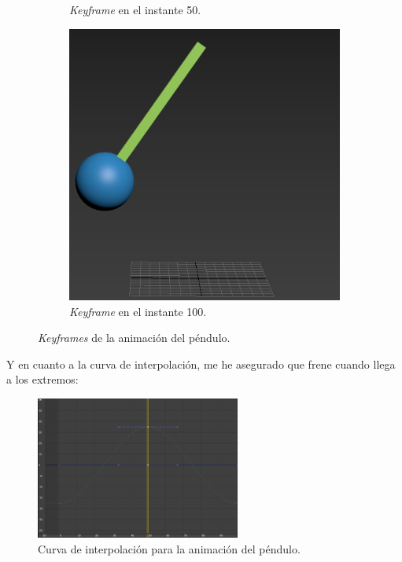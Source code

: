 \documentclass{article}
\begin{document}
\begin{figure}[H]
\begin{subfigure}[H]{0.3\textwidth}
        \caption{\textit{Keyframe} en el instante 50.}
	\end{subfigure}
    \hfill
	\begin{subfigure}[H]{0.3\textwidth}
	    \centering
	    \includegraphics[width=\textwidth]{imagenes/Ejercicio 3/pen_0.png}
        \caption{\textit{Keyframe} en el instante 100.}
	\end{subfigure}
    \caption{\textit{Keyframes} de la animación del péndulo.}
\end{figure}

\bigskip

Y en cuanto a la curva de interpolación, me he asegurado que frene cuando llega a los extremos:

\begin{figure}[H]
    \centering
    \includegraphics[width=0.6\textwidth]{imagenes/Ejercicio 3/curva.png}
    \caption{Curva de interpolación para la animación del péndulo.}
\end{figure}
\end{document}
